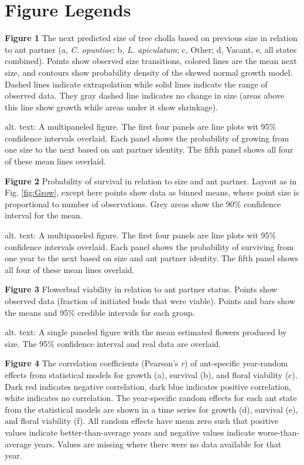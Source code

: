 \documentclass[11pt]{article}
\begin{document}
\newpage{}
\section*{Figure Legends}

\textbf{Figure 1} The next predicted size of tree cholla based on previous size in relation to ant partner (a, \textit{C. opuntiae}; b, \textit{L. apiculatum}; c, Other; d, Vacant, e, all states combined). Points show observed size transitions, colored lines are the mean next size, and contours show probability density of the skewed normal growth model.  
Dashed lines indicate extrapolation while solid lines indicate the range of observed data.
They gray dashed line indicates no change in size (areas above this line show growth while areas under it show shrinkage).

alt. text: A multipaneled figure. The first four panels are line plots wit 95\% confidence intervals overlaid. Each panel shows the probability of growing from one size to the next based on ant partner identity. The fifth panel shows all four of these mean lines overlaid. 

\bigskip

\textbf{Figure 2} Probability of survival in relation to size and ant partner. Layout as in Fig. \ref{fig:Grow}, except here points show data as binned means, where point size is proportional to number of observations. Grey areas show the 90\% confidence interval for the mean.

alt. text: A multipaneled figure. The first four panels are line plots wit 95\% confidence intervals overlaid. Each panel shows the probability of surviving from one year to the next based on size and ant partner identity. The fifth panel shows all four of these mean lines overlaid. 

\bigskip

\textbf{Figure 3} Flowerbud viability in relation to ant partner status. Points show observed data (fraction of initiated buds that were viable). Points and bars show the means and 95\% credible intervals for each group.

alt. text: A single paneled figure with the mean estimated flowers produced by size. The 95\% confidence interval and real data are overlaid.

\bigskip

\textbf{Figure 4} 
The correlation coefficients (Pearson's \textit{r}) of ant-specific year-random effects from statistical models for growth (a), survival (b), and floral viability (c).
Dark red indicates negative correlation, dark blue indicates positive correlation, white indicates no correlation.
The year-specific random effects for each ant state  from the statistical models are shown in a time series for growth (d), survival (e), and floral viability (f).
All random effects have mean zero such that positive values indicate better-than-average years and negative values indicate worse-than-average years. 
Values are missing where there were no data available for that year.
\end{document}
